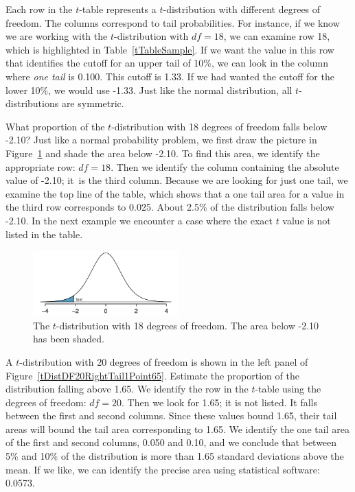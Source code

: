 Each row in the $t$-table represents a $t$-distribution with different degrees of freedom. The columns correspond to tail probabilities. For instance, if we know we are working with the $t$-distribution with $df=18$, we can examine row 18, which is highlighted in Table~\ref{tTableSample}. If we want the value in this row that identifies the cutoff for an upper tail of 10\%, we can look in the column where \emph{one tail} is 0.100. This cutoff is 1.33. If we had wanted the cutoff for the lower 10\%, we would use -1.33. Just like the normal distribution, all $t$-distributions are symmetric.

\begin{example}{What proportion of the $t$-distribution with 18 degrees of freedom falls below -2.10?}
Just like a normal probability problem, we first draw the picture in Figure~\ref{tDistDF18LeftTail2Point10} and shade the area below -2.10. To find this area, we identify the appropriate row: \mbox{$df=18$}. Then we identify the column containing the absolute value of -2.10; it~is the third column. Because we are looking for just one tail, we examine the top line of the table, which shows that a one tail area for a value in the third row corresponds to 0.025. About 2.5\% of the distribution falls below -2.10. In the next example we encounter a case where the exact $t$ value is not listed in the table.
\end{example}

\begin{figure}
\centering
\includegraphics[width=0.5\textwidth]{ch_inference_for_means/figures/tDistDF18LeftTail2Point10/tDistDF18LeftTail2Point10}
\caption{The $t$-distribution with 18 degrees of freedom. The area below -2.10 has been shaded.}
\label{tDistDF18LeftTail2Point10}
\end{figure}

\begin{example}{A $t$-distribution with 20 degrees of freedom is shown in the left panel of Figure~\ref{tDistDF20RightTail1Point65}. Estimate the proportion of the distribution falling above 1.65.}
We identify the row in the $t$-table using the degrees of freedom: $df=20$. Then we look for 1.65; it is not listed. It falls between the first and second columns. Since these values bound 1.65, their tail areas will bound the tail area corresponding to 1.65. We identify the one tail area of the first and second columns, 0.050 and 0.10, and we conclude that between 5\% and 10\% of the distribution is more than 1.65 standard deviations above the mean. If we like, we can identify the precise area using statistical software: 0.0573.
\end{example}

